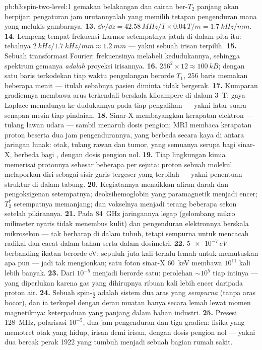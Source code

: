 \begin{solution}{pb:b3:spin-two-level:1}
gemakan belakangan dan cairan ber-$T_2$ panjang akan berpijar:
pengaturan jam urutannyalah yang memilih tetapan pengenduran mana yang
melukis gambarnya.
\textbf{13.} $\dd\nu/\dd z = 42.58\,\unit{MHz/T} \times
0.04\,\unit{T/m} = \qty{1.7}{kHz/mm}$.
\textbf{14.} Lempeng tempat frekuensi Larmor setempatnya jatuh di dalam
pita itu: tebalnya $\qty{2}{kHz}/\qty{1.7}{kHz/mm} \approx
\qty{1.2}{mm}$ --- yakni sebuah irisan terpilih.
\textbf{15.} Sebuah transformasi Fourier: frekuensinya melabeli
kedudukannya, sehingga spektrum gemanya \emph{adalah} proyeksi
irisannya.
\textbf{16.} $256^2 \times 12 \approx \qty{100}{kB}$; dengan satu baris
terkodekan tiap waktu pengulangan berorde $T_1$, $256$ baris memakan
beberapa menit --- itulah sebabnya pasien diminta tidak bergerak.
\textbf{17.} Kumparan gradiennya membawa arus terkendali berskala
kiloampere di dalam \qty{3}{T}: gaya Laplace memalunya ke dudukannya
pada tiap pengalihan --- yakni latar suara senapan mesin tiap pindaian.
\textbf{18.} Sinar-X membayangkan kerapatan elektron --- tulang lawan
udara --- sambil menaruh dosis pengion; MRI membaca kerapatan proton
beserta dua jam pengendurannya, yang berbeda secara kaya di antara
jaringan lunak: otak, tulang rawan dan tumor, yang semuanya serupa bagi
sinar-X, berbeda bagi , dengan dosis pengion nol.
\textbf{19.} Tiap lingkungan kimia memerisai protonnya sebesar beberapa
per sejuta: proton sebuah molekul melaporkan diri sebagai sisir garis
tergeser yang terpilah --- yakni penentuan struktur di dalam tabung.
\textbf{20.} Kegiatannya menaikkan aliran darah dan pengoksigenan
setempatnya; deoksihemoglobin yang paramagnetik menjadi encer; $T_2^*$
setempatnya memanjang; dan vokselnya menjadi terang beberapa sekon
setelah pikirannya.
\textbf{21.} Pada \qty{84}{GHz} jaringannya legap (gelombang mikro
milimeter nyaris tidak menembus kulit) dan pengenduran elektronnya
berskala mikrosekon --- tak berharap di dalam tubuh, tetapi sempurna
untuk mencacah radikal dan cacat dalam bahan serta dalam dosimetri.
\textbf{22.} $\num{5e-7}\,\unit{eV}$ berbanding ikatan berorde eV:
sepuluh juta kali terlalu lemah untuk memutuskan apa pun --- jadi tak
mengionkan; satu foton sinar-X \qty{60}{keV} membawa $10^{11}$ kali
lebih banyak.
\textbf{23.} Dari $10^{-5}$ menjadi berorde satu: perolehan $\sim10^5$
tiap intinya --- yang diperlukan karena gas yang dihirupnya ribuan kali
lebih encer daripada proton air.
\textbf{24.} Sebuah spin-$\tfrac12$ adalah sistem dua aras yang
\emph{sempurna} (tanpa aras bocor), dan ia terkopel dengan derau muatan
hanya secara lemah lewat momen magnetiknya: keterpaduan yang panjang
dalam bahan industri.
\textbf{25.} Presesi \qty{128}{MHz}, polarisasi $10^{-5}$, dua jam
pengenduran dan tiga gradien: fisika  yang memotret otak yang hidup,
irisan demi irisan, dengan dosis pengion nol --- yakni dua bercak perak
1922 yang tumbuh menjadi sebuah bagian rumah sakit.
\end{solution}
